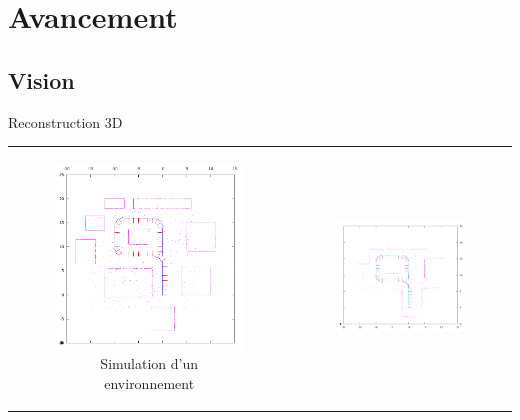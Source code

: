 \documentclass{beamer}
\begin{document}

\section{Avancement}

\subsection*{Vision}
\begin{frame}{Reconstruction 3D}
  \begin{tabular}{c c}
    \begin{minipage}{0.5\linewidth}
      \begin{figure}
        \includegraphics[width=0.9\linewidth]{images/createimages.png}
        \caption{Simulation d'un environnement}
      \end{figure}
    \end{minipage}
    &
    \begin{minipage}{0.5\linewidth}
      \begin{figure}
        \includegraphics[width=1.0\linewidth]{images/buildfromvideo.png}

\end{figure}
\end{minipage}
\end{tabular}
\end{frame}
\end{document}
